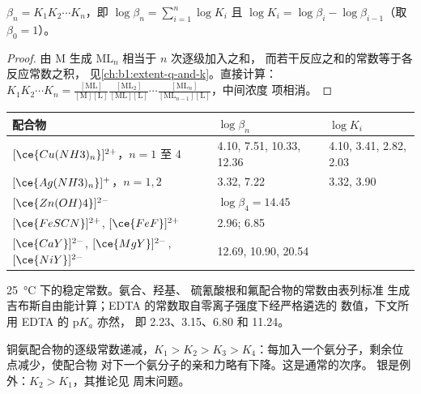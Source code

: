 \begin{proposition}[累积稳定常数与逐级稳定常数]\label{prop:b1:complexation:beta-k}
$\beta_n = K_1 K_2 \cdots K_n$，即
$\log\beta_n = \sum_{i=1}^n \log K_i$ 且 $\log K_i = \log\beta_i -
\log\beta_{i-1}$（取 $\beta_0 = 1$）。
\end{proposition}

\begin{proof}
由 M 生成 $\mathrm{ML}_n$ 相当于 $n$ 次逐级加入之和，
而若干反应之和的常数等于各反应常数之积，
见\cref{ch:b1:extent-q-and-k}。直接计算：
$K_1 K_2\cdots K_n = \frac{[\mathrm{ML}]}{[\mathrm{M}][\mathrm{L}]}
\frac{[\mathrm{ML_2}]}{[\mathrm{ML}][\mathrm{L}]}\cdots
\frac{[\mathrm{ML}_n]}{[\mathrm{ML}_{n-1}][\mathrm{L}]}$，中间浓度
项相消。
\end{proof}

\begin{omfigure}
\begin{tabular}{lll}
\hline
配合物 & $\log\beta_n$ & $\log K_i$ \\
\hline
$[\ce{Cu(NH3)_n}]^{2+}$，$n = 1$ 至 4 & 4.10, 7.51, 10.33, 12.36 & 4.10, 3.41, 2.82, 2.03 \\
$[\ce{Ag(NH3)_n}]^{+}$，$n = 1, 2$ & 3.32, 7.22 & 3.32, 3.90 \\
$[\ce{Zn(OH)4}]^{2-}$ & $\log\beta_4 = 14.45$ & \\
$[\ce{FeSCN}]^{2+}$, $[\ce{FeF}]^{2+}$ & 2.96; 6.85 & \\
$[\ce{CaY}]^{2-}$, $[\ce{MgY}]^{2-}$, $[\ce{NiY}]^{2-}$ & 12.69, 10.90, 20.54 & \\
\hline
\end{tabular}

\smallskip
{\small \qty{25}{\celsius} 下的稳定常数。氨合、羟基、
硫氰酸根和氟配合物的常数由表列标准
生成吉布斯自由能计算；EDTA 的常数取自零离子强度下经严格遴选的
数值，下文所用 EDTA 的 $\mathrm{p}K_a$ 亦然，
即 2.23、3.15、6.80 和 11.24。}
\end{omfigure}

铜氨配合物的逐级常数递减，$K_1 > K_2 > K_3
> K_4$：每加入一个氨分子，剩余位点减少，使配合物
对下一个氨分子的亲和力略有下降。这是通常的次序。
银是例外：$K_2 > K_1$，其推论见
周末问题。

